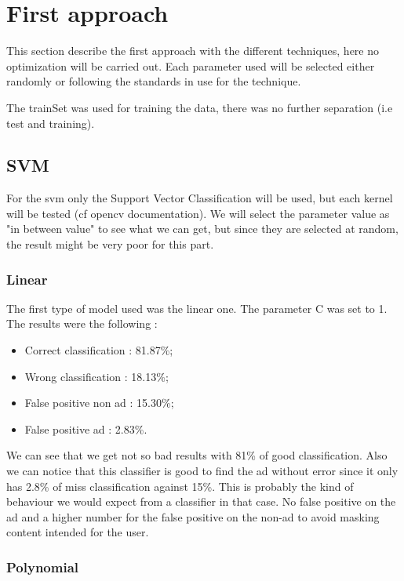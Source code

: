 \section{First approach}

This section describe the first approach with the different techniques, here no optimization will be carried out. Each parameter used will be selected either randomly or following the standards in use for the technique.

The trainSet was used for training the data, there was no further separation (i.e test and training).

\subsection{SVM}

For the svm only the Support Vector Classification will be used, but each kernel will be tested (cf opencv documentation).
We will select the parameter value as "in between value" to see what we can get, but since they are selected at random, the result might be very poor for this part.

\subsubsection{Linear}

The first type of model used was the linear one. The parameter C was set to 1. The results were the following :
\begin{itemize}
  \item Correct classification : 81.87\%;
  \item Wrong classification : 18.13\%;
  \item False positive non ad : 15.30\%;
  \item False positive ad : 2.83\%.
\end{itemize}

We can see that we get not so bad results with 81\% of good classification. Also we can notice that this classifier is good to find the ad without error since it only has 2.8\% of miss classification against 15\%. This is probably the kind of behaviour we would expect from a classifier in that case. No false positive on the ad and a higher number for the false positive on the non-ad to avoid masking content intended for the user.

\subsubsection{Polynomial}

